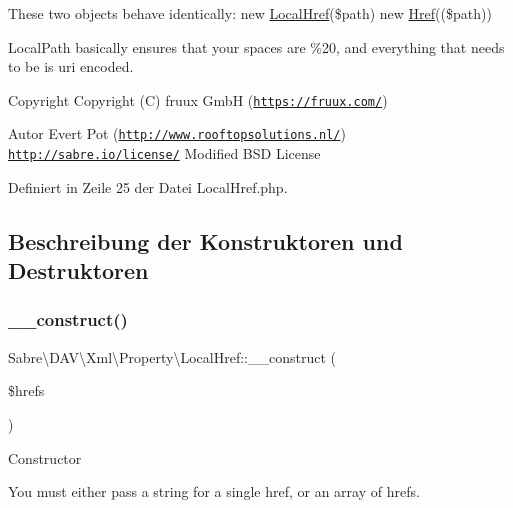 These two objects behave identically\+: new \mbox{\hyperlink{class_sabre_1_1_d_a_v_1_1_xml_1_1_property_1_1_local_href}{Local\+Href}}(\$path) new \mbox{\hyperlink{class_sabre_1_1_d_a_v_1_1_xml_1_1_property_1_1_href}{Href}}((\$path))

Local\+Path basically ensures that your spaces are \%20, and everything that needs to be is uri encoded.

\begin{DoxyCopyright}{Copyright}
Copyright (C) fruux GmbH (\href{https://fruux.com/}{\tt https\+://fruux.\+com/}) 
\end{DoxyCopyright}
\begin{DoxyAuthor}{Autor}
Evert Pot (\href{http://www.rooftopsolutions.nl/}{\tt http\+://www.\+rooftopsolutions.\+nl/})  \href{http://sabre.io/license/}{\tt http\+://sabre.\+io/license/} Modified B\+SD License 
\end{DoxyAuthor}


Definiert in Zeile 25 der Datei Local\+Href.\+php.



\subsection{Beschreibung der Konstruktoren und Destruktoren}
\mbox{\label{class_sabre_1_1_d_a_v_1_1_xml_1_1_property_1_1_local_href_a5aaa48ba1511601561f56140369e9136}} 
\subsubsection{\texorpdfstring{\+\_\+\+\_\+construct()}{\_\_construct()}}
{\footnotesize\ttfamily Sabre\textbackslash{}\+D\+A\+V\textbackslash{}\+Xml\textbackslash{}\+Property\textbackslash{}\+Local\+Href\+::\+\_\+\+\_\+construct (\begin{DoxyParamCaption}\item[{}]{\$hrefs }\end{DoxyParamCaption})}

Constructor

You must either pass a string for a single href, or an array of hrefs.

